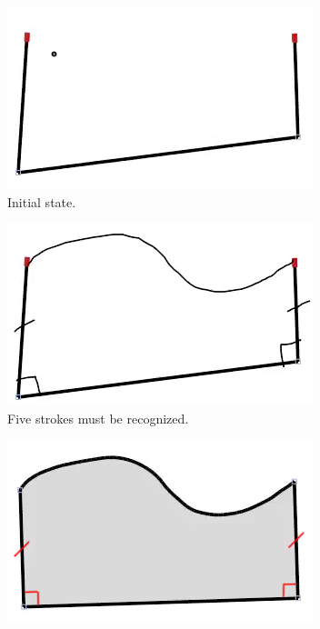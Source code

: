 \begin{figure}
  \centering
  \begin{subfigure}[t]{0.26\textwidth}
    \centering
    \includegraphics[width=\linewidth]{img/delayed-example-1.png}
    \caption{Initial state.}
    \label{fig:delayed-example-1}
  \end{subfigure}
  \hspace{0.05\linewidth}
  \begin{subfigure}[t]{0.26\textwidth}
    \centering
    \includegraphics[width=\linewidth]{img/delayed-example-2.png}
    \caption{Five strokes must be recognized.}
    \label{fig:delayed-example-2}
  \end{subfigure}
  \hspace{0.05\linewidth}
  \begin{subfigure}[t]{0.26\textwidth}
    \centering
    \includegraphics[width=\linewidth]{img/delayed-example-3.png}

\end{subfigure}
\end{figure}

